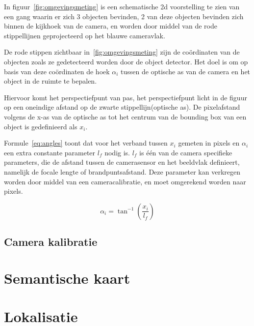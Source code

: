 In figuur~\ref{fig:omgevingsmeting} is een schematische 2d voorstelling te zien van een gang waarin er zich 3 objecten bevinden, 2 van deze objecten bevinden zich
binnen de kijkhoek van de camera, en worden door middel van de rode stippellijnen geprojecteerd op het blauwe cameravlak.

De rode stippen zichtbaar in~\ref{fig:omgevingsmeting} zijn de co\"{o}rdinaten van de objecten zoals ze gedetecteerd worden door de object detector.
Het doel is om op basis van deze co\"{o}rdinaten de hoek $\alpha_i$ tussen de optische as van de camera en het object in de ruimte te bepalen.

Hiervoor komt het perspectiefpunt van pas, het perspectiefpunt licht in de figuur op een oneindige afstand op de zwarte stippellijn(optische as).
De pixelafstand volgens de x-as van de optische as tot het centrum van de bounding box van een object is gedefinieerd als $x_i$.

Formule~\ref{eq:angles} toont dat voor het verband tussen $x_i$ gemeten in pixels en $\alpha_i$ een extra constante parameter $l_f$ nodig is.
$l_f$ is \'{e}\'{e}n van de camera specifieke parameters, die de afstand tussen de camerasensor en het beeldvlak definieert, namelijk de focale lengte of brandpuntsafstand.
Deze parameter kan verkregen worden door middel van een cameracalibratie, en moet omgerekend worden naar pixels.

\begin{equation}
    \alpha_i = \tan^{-1}(\frac{x_i}{l_f})
    \label{eq:angles}
\end{equation}

\subsection{Camera kalibratie}

\section{Semantische kaart}\label{sec:sem_kaart}

\section{Lokalisatie}\label{sec:lokalisatie}